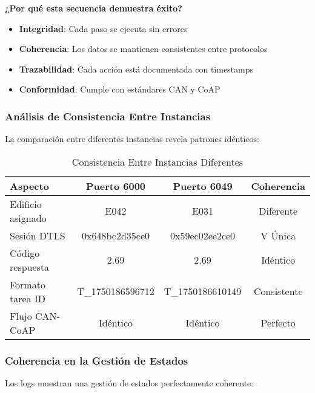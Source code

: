 \textbf{¿Por qué esta secuencia demuestra éxito?}
\begin{itemize}
    \item \textbf{Integridad}: Cada paso se ejecuta sin errores
    \item \textbf{Coherencia}: Los datos se mantienen consistentes entre protocolos
    \item \textbf{Trazabilidad}: Cada acción está documentada con timestamps
    \item \textbf{Conformidad}: Cumple con estándares CAN y CoAP
\end{itemize}

\subsubsection{Análisis de Consistencia Entre Instancias}

La comparación entre diferentes instancias revela patrones idénticos: \vspace{6em}

\begin{table}[h]
\centering
\begin{tabular}{|l|c|c|c|}
\hline
\textbf{Aspecto} & \textbf{Puerto 6000} & \textbf{Puerto 6049} & \textbf{Coherencia} \\
\hline
Edificio asignado & E042 & E031 & \textcolor{successgreen}{Diferente} \\
Sesión DTLS & 0x648bc2d35ce0 & 0x59ec02ee2ce0 & \textcolor{successgreen}{V Única} \\
Código respuesta & 2.69 & 2.69 & \textcolor{successgreen}{Idéntico} \\
Formato tarea ID & T\_1750186596712 & T\_1750186610149 & \textcolor{successgreen}{Consistente} \\
Flujo CAN-CoAP & Idéntico & Idéntico & \textcolor{successgreen}{Perfecto} \\
\hline
\end{tabular}
\caption{Consistencia Entre Instancias Diferentes}
\label{tab:consistencia-instancias}
\end{table}

\subsubsection{Coherencia en la Gestión de Estados}

Los logs muestran una gestión de estados perfectamente coherente:

